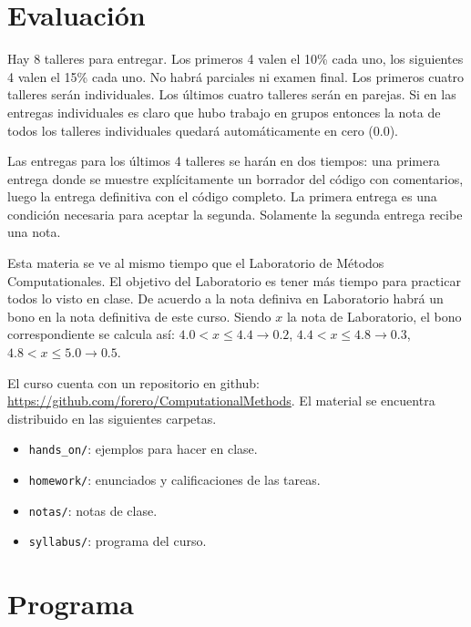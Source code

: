 \documentclass[11pt]{article}
\begin{document}
\section*{Evaluaci\'on}

Hay 8 talleres para entregar. Los primeros 4 valen el 10\% cada uno,
los siguientes 4 valen el 15\% cada uno. No habr\'a parciales ni
examen final. Los primeros cuatro talleres ser\'an individuales. Los
\'ultimos cuatro talleres ser\'an en parejas.  Si en las entregas
individuales es claro que hubo trabajo en grupos entonces la nota de
todos los talleres individuales quedar\'a autom\'aticamente en cero
(0.0).  

Las entregas para los \'ultimos 4 talleres se har\'an en dos tiempos:
una primera entrega donde se muestre expl\'icitamente un borrador del
c\'odigo con comentarios, luego la entrega definitiva con el c\'odigo
completo. La primera entrega es una condici\'on necesaria para aceptar
la segunda. Solamente la segunda entrega recibe una nota. 

Esta materia se ve al mismo tiempo que el Laboratorio de M\'etodos
Computationales. El objetivo del Laboratorio es tener m\'as tiempo
para practicar todos lo visto en clase. De acuerdo a la
nota definiva en Laboratorio habr\'a un bono en la nota definitiva de
este curso. Siendo $x$ la nota de Laboratorio, el bono correspondiente
se calcula as\'i:
$4.0 < x \leq 4.4 \rightarrow 0.2$, $4.4< x\leq 4.8\rightarrow 0.3$, $4.8<x
\leq 5.0\rightarrow 0.5$.


El curso cuenta con un repositorio en github:
\url{https://github.com/forero/ComputationalMethods}. El material se
encuentra distribuido en las siguientes carpetas. 


\begin{itemize}
\item \texttt{hands\_on/}: ejemplos para hacer en clase.
\item \texttt{homework/}: enunciados y calificaciones de las tareas.
\item \texttt{notas/}: notas de clase.
\item \texttt{syllabus/}: programa del curso.
\end{itemize}
 
 

\section*{Programa}
\end{document}
